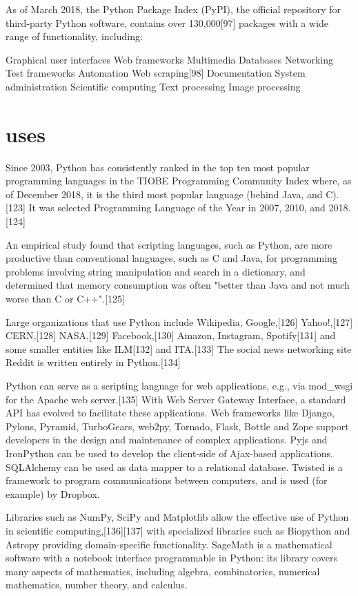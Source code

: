 \documentclass[conference]{IEEEtran} %
\begin{document}
As of March 2018, the Python Package Index (PyPI), the official repository for third-party Python software, contains over 130,000[97] packages with a wide range of functionality, including:

    Graphical user interfaces
    Web frameworks
    Multimedia
    Databases
    Networking
    Test frameworks
    Automation
    Web scraping[98]
    Documentation
    System administration
    Scientific computing
    Text processing
    Image processing
\section{uses}
Since 2003, Python has consistently ranked in the top ten most popular programming languages in the TIOBE Programming Community Index where, as of December 2018, it is the third most popular language (behind Java, and C).[123] It was selected Programming Language of the Year in 2007, 2010, and 2018.[124]

An empirical study found that scripting languages, such as Python, are more productive than conventional languages, such as C and Java, for programming problems involving string manipulation and search in a dictionary, and determined that memory consumption was often "better than Java and not much worse than C or C++".[125]

Large organizations that use Python include Wikipedia, Google,[126] Yahoo!,[127] CERN,[128] NASA,[129] Facebook,[130] Amazon, Instagram, Spotify[131] and some smaller entities like ILM[132] and ITA.[133] The social news networking site Reddit is written entirely in Python.[134]

Python can serve as a scripting language for web applications, e.g., via mod_wsgi for the Apache web server.[135] With Web Server Gateway Interface, a standard API has evolved to facilitate these applications. Web frameworks like Django, Pylons, Pyramid, TurboGears, web2py, Tornado, Flask, Bottle and Zope support developers in the design and maintenance of complex applications. Pyjs and IronPython can be used to develop the client-side of Ajax-based applications. SQLAlchemy can be used as data mapper to a relational database. Twisted is a framework to program communications between computers, and is used (for example) by Dropbox.

Libraries such as NumPy, SciPy and Matplotlib allow the effective use of Python in scientific computing,[136][137] with specialized libraries such as Biopython and Astropy providing domain-specific functionality. SageMath is a mathematical software with a notebook interface programmable in Python: its library covers many aspects of mathematics, including algebra, combinatorics, numerical mathematics, number theory, and calculus.
\end{document}
